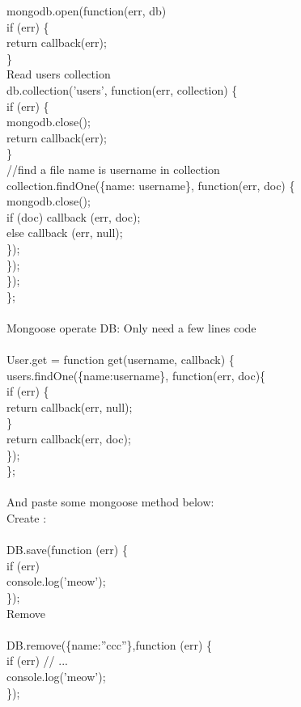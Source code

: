 	mongodb.open(function(err, db) {\\
		if (err) \{\\
			return callback(err);\\
		\}\\
		Read users collection\\ 
		db.collection('users', function(err, collection) \{\\
			if (err) \{\\
				mongodb.close();\\
				return callback(err);\\
			\}\\
			//find a file name is username in collection\\
			collection.findOne(\{name: username\}, function(err, doc) \{\\
				mongodb.close();\\
				if (doc) callback (err, doc);\\
				else callback (err, null);\\
			\});\\
		\});\\
	\});\\
\};\\
\\
Mongoose operate DB: Only need a few lines code\\
\\
User.get = function get(username, callback) \{\\
	users.findOne(\{name:username\}, function(err, doc)\{\\
		if (err) \{\\
			return callback(err, null);\\
		\}\\
		return callback(err, doc);\\
	\});\\
\};\\
\\
And paste some mongoose method below:\\
Create : \\
\\
DB.save(function (err) \{\\
	if (err) \\
	console.log('meow');\\
\});\\
Remove\\
\\
DB.remove(\{name:”ccc”\},function (err) \{\\
	if (err) // ...\\
	console.log('meow');\\
\});\\

}
